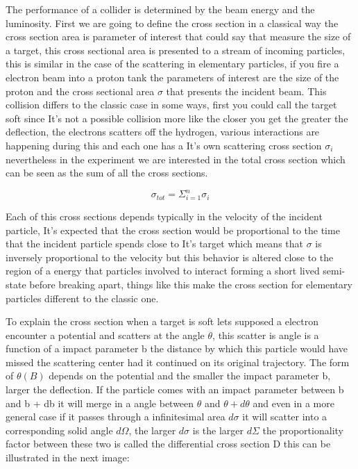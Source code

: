 The performance of a collider is determined by the beam energy and the luminosity. First we are going to define the cross section in a classical way the cross section area is parameter of interest that could say that measure the size of a target, this cross sectional area is presented to a stream of incoming particles, this is similar in the case of the scattering in elementary particles, if you fire a electron beam into a proton tank the parameters of interest are the size of the proton and the cross sectional area $\sigma$ that presents the incident beam. This collision differs to the classic case in some ways, first you could call the target soft since It's not a possible collision more like the closer you get the greater the deflection, the electrons scatters off the hydrogen, various interactions are happening during this and each one has a It's own scattering cross section $\sigma_{i}$ nevertheless in the experiment we are interested in the total cross section which can be seen as the sum of all the cross sections.

\begin{equation}
\sigma_{tot} = \Sigma^{n}_{i=1} \sigma_{i}
\end{equation}

Each of this cross sections depends typically in the velocity of the incident particle, It's expected that the cross section would be proportional to the time that the incident particle spends close to It's target which means that $\sigma$ is inversely proportional to the velocity but this behavior is altered close to the region of a energy that particles involved to interact forming a short lived semi-state before breaking apart, things like this make the cross section for elementary particles different to the classic one. 

To explain the cross section when a target is soft lets supposed a electron encounter a potential and scatters at the angle $\theta$, this scatter is angle is a function of a impact parameter b the distance by which this particle would have missed the scattering center had it continued on its original trajectory. The form of $\theta(B)$ depends on the potential and the smaller the impact parameter b, larger the deflection. If the particle comes with an impact parameter between b and b + db it will merge in a angle between $\theta$ and $\theta + d\theta$ and even in a more general case if it passes through a infinitesimal area $d\sigma$ it will scatter into a corresponding solid angle $d\Omega$, the larger $d\sigma$ is the larger $d\Sigma$ the proportionality factor between these two is called the differential cross section D this can be illustrated in the next image: 

